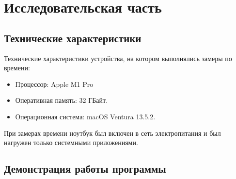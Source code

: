 \chapter{Исследовательская часть}

\section{Технические характеристики}

Технические характеристики устройства, на котором выполнялись замеры по времени:

\begin{itemize}
	\item Процессор: Apple M1 Pro \cite{m1}
	\item Оперативная память: 32 ГБайт.
	\item Операционная система: macOS Ventura 13.5.2. \cite{macOS}
\end{itemize}

При замерах времени ноутбук был включен в сеть электропитания и был нагружен только системными приложениями.

\section{Демонстрация работы программы}

